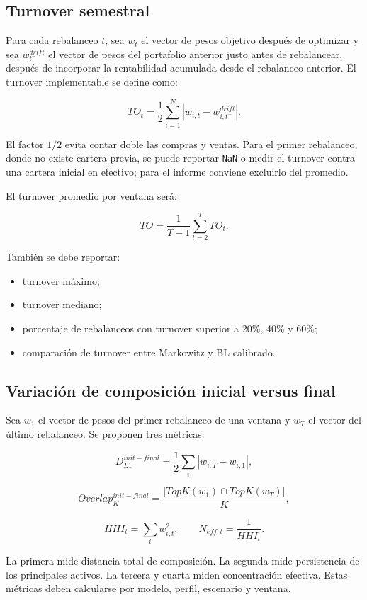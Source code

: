 \documentclass[11pt]{article}
\begin{document}
\subsection{Turnover semestral}

Para cada rebalanceo $t$, sea $w_t$ el vector de pesos objetivo despu\'es de optimizar y sea $w_{t^-}^{drift}$ el vector de pesos del portafolio anterior justo antes de rebalancear, despu\'es de incorporar la rentabilidad acumulada desde el rebalanceo anterior. El turnover implementable se define como:

\[
TO_t = \frac{1}{2}\sum_{i=1}^{N} \left|w_{i,t} - w_{i,t^-}^{drift}\right|.
\]

El factor $1/2$ evita contar doble las compras y ventas. Para el primer rebalanceo, donde no existe cartera previa, se puede reportar \texttt{NaN} o medir el turnover contra una cartera inicial en efectivo; para el informe conviene excluirlo del promedio.

El turnover promedio por ventana ser\'a:

\[
\overline{TO} = \frac{1}{T-1}\sum_{t=2}^{T} TO_t.
\]

Tambi\'en se debe reportar:

\begin{itemize}
    \item turnover m\'aximo;
    \item turnover mediano;
    \item porcentaje de rebalanceos con turnover superior a 20\%, 40\% y 60\%;
    \item comparaci\'on de turnover entre Markowitz y BL calibrado.
\end{itemize}

\subsection{Variaci\'on de composici\'on inicial versus final}

Sea $w_1$ el vector de pesos del primer rebalanceo de una ventana y $w_T$ el vector del \'ultimo rebalanceo. Se proponen tres m\'etricas:

\[
D_{L1}^{init-final} = \frac{1}{2}\sum_i |w_{i,T} - w_{i,1}|,
\]

\[
Overlap_{K}^{init-final} =
\frac{|TopK(w_1) \cap TopK(w_T)|}{K},
\]

\[
HHI_t = \sum_i w_{i,t}^2, \qquad
N_{eff,t} = \frac{1}{HHI_t}.
\]

La primera mide distancia total de composici\'on. La segunda mide persistencia de los principales activos. La tercera y cuarta miden concentraci\'on efectiva. Estas m\'etricas deben calcularse por modelo, perfil, escenario y ventana.
\end{document}
